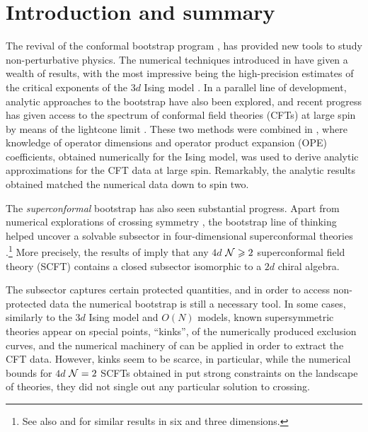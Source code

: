 \section{Introduction and summary}
\label{sec:intro}

The revival of the conformal bootstrap program \cite{Rattazzi:2008pe}, has provided new tools to study non-perturbative physics. The numerical techniques introduced in \cite{Rattazzi:2008pe} have given a wealth of results, with the most impressive being the high-precision estimates of the critical exponents of the $3d$ Ising model \cite{ElShowk:2012ht,El-Showk:2014dwa,Kos:2014bka,Simmons-Duffin:2015qma,Kos:2016ysd}. 
In a parallel line of development, analytic approaches to the bootstrap have also been explored, and recent progress has given access to the spectrum of conformal field theories (CFTs) at large spin by means of the lightcone limit \cite{Fitzpatrick:2012yx,Komargodski:2012ek}.
These two methods were combined in \cite{Alday:2015ota,Simmons-Duffin:2016wlq}, where knowledge of
operator dimensions and operator product expansion (OPE) coefficients, obtained numerically for the Ising model, was used to derive analytic approximations for the CFT data at large spin. Remarkably, the analytic results obtained matched the numerical data down to spin two.


The \emph{superconformal} bootstrap has also seen substantial progress. Apart from numerical explorations of crossing symmetry \cite{Poland:2010wg,Poland:2011ey,Poland:2015mta,Li:2017ddj,Berkooz:2014yda,
Beem:2014zpa,Beem:2013qxa,Alday:2013opa,Alday:2014qfa,
Chester:2014fya,Chester:2014mea,Lemos:2015awa,Chester:2015qca,
Bobev:2015vsa,Bobev:2015jxa,Bae:2016jpi,Beem:2015aoa,Lin:2015wcg,Lin:2016gcl,Beem:2016wfs,Lemos:2016xke,
Cornagliotto:2017dup,Chang:2017xmr,Chang:2017cdx}, the bootstrap line of thinking helped uncover a solvable subsector in four-dimensional superconformal theories \cite{Beem:2013sza}.\footnote{See also \cite{Beem:2014kka} and \cite{Chester:2014mea,Beem:2016cbd} for similar results in six and three dimensions.} More precisely, the results of \cite{Beem:2013sza} imply that any $4d$ ${\mathcal{N}} \geqslant 2$ superconformal field theory (SCFT) contains a closed subsector isomorphic to a $2d$ chiral algebra.

The subsector captures certain protected quantities, and in order to access non-protected data the numerical bootstrap is still a necessary tool. In some cases, similarly to the $3d$ Ising model and $O(N)$ models, known supersymmetric theories appear on special points, ``kinks'', of the numerically produced exclusion curves, and the numerical machinery of \cite{Rattazzi:2008pe} can be applied in order to extract the CFT data.
%
However, kinks seem to be scarce, in particular, while the numerical bounds for $4d$ ${\mathcal{N}}=2$ SCFTs obtained in \cite{Beem:2014zpa,Lemos:2015awa} put strong constraints on the landscape of theories, they did not single out any particular solution to crossing. 

